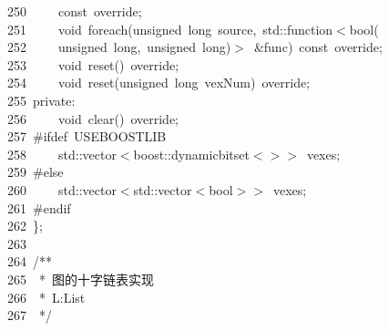 \documentclass{ctexart}
\newcommand{\hlstd}[1]{\textcolor[rgb]{0.2,0.2,0.2}{#1}}
\newcommand{\hlcom}[1]{\textcolor[rgb]{0.59,0.59,0.59}{#1}}
\newcommand{\hlppc}[1]{\textcolor[rgb]{0.41,0.78,0.23}{#1}}
\newcommand{\hlopt}[1]{\textcolor[rgb]{0.2,0.2,0.2}{#1}}
\newcommand{\hllin}[1]{\textcolor[rgb]{0.59,0.59,0.59}{#1}}
\newcommand{\hlkwb}[1]{\textcolor[rgb]{0.63,0,0.31}{#1}}
\newcommand{\hlkwc}[1]{\textcolor[rgb]{0,0.63,0.31}{#1}}
\newcommand{\hlkwd}[1]{\textcolor[rgb]{0.78,0.23,0.41}{#1}}
\begin{document}
\hllin{250\ }\hlstd{}\hlstd{\ \ \ \ }\hlstd{}\hlkwb{const\ }\hlstd{override}\hlopt{;}\\
\hllin{251\ }\hlstd{}\hlstd{\ \ \ \ }\hlstd{}\hlkwb{void\ }\hlstd{}\hlkwd{foreach}\hlstd{}\hlopt{(}\hlstd{}\hlkwb{unsigned\ long\ }\hlstd{source}\hlopt{,\ }\hlstd{}\hlkwc{std}\hlstd{}\hlopt{::}\hlstd{function}\hlopt{$<$}\hlstd{}\hlkwb{bool}\hlstd{}\hlopt{(}\Righttorque\\
\hllin{252\ }\hlstd{}\hlstd{\ \ \ \ }\hlstd{}\hlkwb{unsigned\ long}\hlstd{}\hlopt{,\ }\hlstd{}\hlkwb{unsigned\ long}\hlstd{}\hlopt{)$>$\ \&}\hlstd{func}\hlopt{)\ }\hlstd{}\hlkwb{const\ }\hlstd{override}\hlopt{;}\\
\hllin{253\ }\hlstd{}\hlstd{\ \ \ \ }\hlstd{}\hlkwb{void\ }\hlstd{}\hlkwd{reset}\hlstd{}\hlopt{()\ }\hlstd{override}\hlopt{;}\\
\hllin{254\ }\hlstd{}\hlstd{\ \ \ \ }\hlstd{}\hlkwb{void\ }\hlstd{}\hlkwd{reset}\hlstd{}\hlopt{(}\hlstd{}\hlkwb{unsigned\ long\ }\hlstd{vexNum}\hlopt{)\ }\hlstd{override}\hlopt{;}\\
\hllin{255\ }\hlstd{}\hlkwc{private}\hlstd{}\hlopt{:}\\
\hllin{256\ }\hlstd{}\hlstd{\ \ \ \ }\hlstd{}\hlkwb{void\ }\hlstd{}\hlkwd{clear}\hlstd{}\hlopt{()\ }\hlstd{override}\hlopt{;}\\
\hllin{257\ }\hlstd{}\hlppc{\#ifdef\ USE\textunderscore BOOST\textunderscore LIB}\\
\hllin{258\ }\hlstd{}\hlstd{\ \ \ \ }\hlstd{}\hlkwc{std}\hlstd{}\hlopt{::}\hlstd{vector}\hlopt{$<$}\hlstd{}\hlkwc{boost}\hlstd{}\hlopt{::}\hlstd{dynamic\textunderscore bitset}\hlopt{$<$$>$$>$\ }\hlstd{vexes}\hlopt{;}\\
\hllin{259\ }\hlstd{}\hlppc{\#else}\\
\hllin{260\ }\hlstd{}\hlstd{\ \ \ \ }\hlstd{}\hlkwc{std}\hlstd{}\hlopt{::}\hlstd{vector}\hlopt{$<$}\hlstd{}\hlkwc{std}\hlstd{}\hlopt{::}\hlstd{vector}\hlopt{$<$}\hlstd{}\hlkwb{bool}\hlstd{}\hlopt{$>$$>$\ }\hlstd{vexes}\hlopt{;}\\
\hllin{261\ }\hlstd{}\hlppc{\#endif}\\
\hllin{262\ }\hlstd{}\hlopt{\};}\\
\hllin{263\ }\hlstd{}\\
\hllin{264\ }\hlstd{}\hlcom{/{*}{*}}\\
\hllin{265\ }\hlcom{\ {*}\ 图的十字链表实现}\\
\hllin{266\ }\hlcom{\ {*}\ L:List}\\
\hllin{267\ }\hlcom{\ {*}/}\hlstd{}\\
\end{document}
